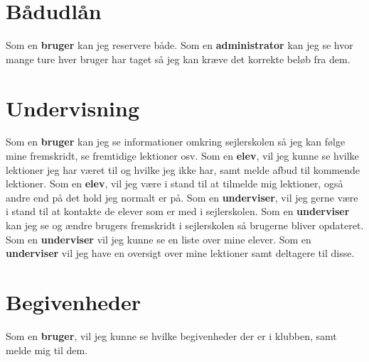 \section{Bådudlån}

Som en \textbf{bruger} kan jeg reservere både.
\newline
Som en \textbf{administrator} kan jeg se hvor mange ture hver bruger har taget så jeg kan kræve det korrekte beløb fra dem.

\section{Undervisning}
Som en \textbf{bruger} kan jeg se informationer omkring sejlerskolen så jeg kan følge mine fremskridt, se fremtidige lektioner osv. 
\newline
Som en \textbf{elev}, vil jeg kunne se hvilke lektioner jeg har været til og hvilke jeg ikke har, samt melde afbud til kommende lektioner.
\newline
Som en \textbf{elev}, vil jeg være i stand til at tilmelde mig lektioner, også andre end på det hold jeg normalt er på.
\newline
Som en \textbf{underviser}, vil jeg gerne være i stand til at kontakte de elever som er med i sejlerskolen.
\newline
Som en \textbf{underviser} kan jeg se og ændre brugers fremskridt i sejlerskolen så brugerne bliver opdateret.
\newline
Som en \textbf{underviser} vil jeg kunne se en liste over mine elever.
\newline
Som en \textbf{underviser} vil jeg have en oversigt over mine lektioner samt deltagere til disse.

\section{Begivenheder}
Som en \textbf{bruger}, vil jeg kunne se hvilke begivenheder der er i klubben, samt melde mig til dem.

